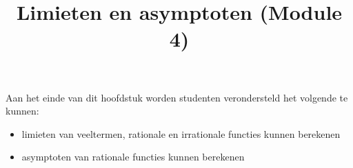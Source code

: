 \documentclass{ximera}
\title{Limieten en asymptoten (Module 4)}
\begin{document}
\begin{abstract}
\end{abstract}

\maketitle

\begin{sectionOutcomes}

Aan het einde van dit hoofdstuk worden studenten verondersteld het volgende te kunnen:

\begin{itemize}
\item limieten van veeltermen, rationale en irrationale functies kunnen berekenen
\item asymptoten van rationale functies kunnen berekenen
\end{itemize}

\end{sectionOutcomes}

\end{document}
